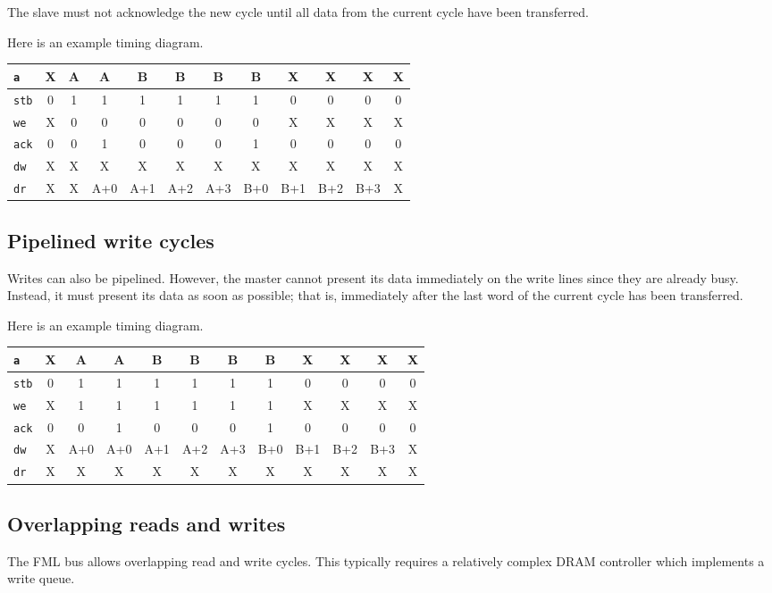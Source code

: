 \documentclass[a4paper,11pt]{article}
\begin{document}
The slave must not acknowledge the new cycle until all data from the current cycle have been transferred.

Here is an example timing diagram.

\begin{tabular}{|l|c|c|c|c|c|c|c|c|c|c|c|}
\hline
\verb!a! & X & A & A & B & B & B & B & X & X & X & X\\
\hline
\verb!stb! & 0 & 1 & 1 & 1 & 1 & 1 & 1 & 0 & 0 & 0 & 0 \\
\hline
\verb!we! & X & 0 & 0 & 0 & 0 & 0 & 0 & X & X & X & X \\
\hline
\verb!ack! & 0 & 0 & 1 & 0 & 0 & 0 & 1 & 0 & 0 & 0 & 0 \\
\hline
\verb!dw! & X & X & X & X & X & X & X & X & X & X & X \\
\hline
\verb!dr! & X & X & A+0 & A+1 & A+2 & A+3 & B+0 & B+1 & B+2 & B+3 & X \\
\hline
\end{tabular}

\subsection{Pipelined write cycles}
Writes can also be pipelined. However, the master cannot present its data immediately on the write lines since they are already busy. Instead, it must present its data as soon as possible; that is, immediately after the last word of the current cycle has been transferred.

Here is an example timing diagram.

\begin{tabular}{|l|c|c|c|c|c|c|c|c|c|c|c|}
\hline
\verb!a! & X & A & A & B & B & B & B & X & X & X & X\\
\hline
\verb!stb! & 0 & 1 & 1 & 1 & 1 & 1 & 1 & 0 & 0 & 0 & 0 \\
\hline
\verb!we! & X & 1 & 1 & 1 & 1 & 1 & 1 & X & X & X & X \\
\hline
\verb!ack! & 0 & 0 & 1 & 0 & 0 & 0 & 1 & 0 & 0 & 0 & 0 \\
\hline
\verb!dw! & X & A+0 & A+0 & A+1 & A+2 & A+3 & B+0 & B+1 & B+2 & B+3 & X \\
\hline
\verb!dr! & X & X & X & X & X & X & X & X & X & X & X \\
\hline
\end{tabular}

\subsection{Overlapping reads and writes}
The FML bus allows overlapping read and write cycles. This typically requires a relatively complex DRAM controller which implements a write queue.
\end{document}
